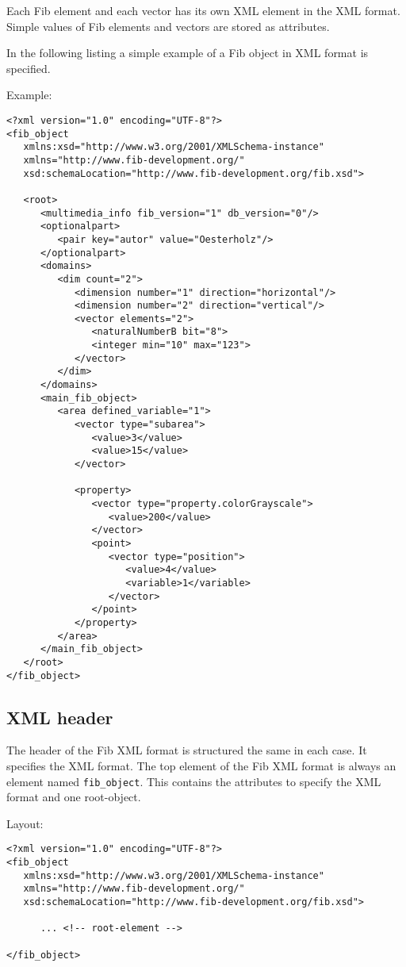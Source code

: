 Each Fib element and each vector has its own XML element in the XML format. Simple values of Fib elements and vectors are stored as attributes.

In the following listing a simple example of a Fib object in XML format is specified.

\bigskip\noindent
Example:
\begin{verbatim}
<?xml version="1.0" encoding="UTF-8"?>
<fib_object
   xmlns:xsd="http://www.w3.org/2001/XMLSchema-instance"
   xmlns="http://www.fib-development.org/"
   xsd:schemaLocation="http://www.fib-development.org/fib.xsd">

   <root>
      <multimedia_info fib_version="1" db_version="0"/>
      <optionalpart>
         <pair key="autor" value="Oesterholz"/>
      </optionalpart>
      <domains>
         <dim count="2">
            <dimension number="1" direction="horizontal"/>
            <dimension number="2" direction="vertical"/>
            <vector elements="2">
               <naturalNumberB bit="8">
               <integer min="10" max="123">
            </vector>
         </dim>
      </domains>
      <main_fib_object>
         <area defined_variable="1">
            <vector type="subarea">
               <value>3</value>
               <value>15</value>
            </vector>

            <property>
               <vector type="property.colorGrayscale">
                  <value>200</value>
               </vector>
               <point>
                  <vector type="position">
                     <value>4</value>
                     <variable>1</variable>
                  </vector>
               </point>
            </property>
         </area>
      </main_fib_object>
   </root>
</fib_object>
\end{verbatim}


\subsection{XML header}

The header of the Fib XML format is structured the same in each case. It specifies the XML format. The top element of the Fib XML format is always an element named \verb|fib_object|. This contains the attributes to specify the XML format and one root-object.

\bigskip\noindent
Layout:
\begin{verbatim}
<?xml version="1.0" encoding="UTF-8"?>
<fib_object
   xmlns:xsd="http://www.w3.org/2001/XMLSchema-instance"
   xmlns="http://www.fib-development.org/"
   xsd:schemaLocation="http://www.fib-development.org/fib.xsd">

      ... <!-- root-element -->

</fib_object>
\end{verbatim}


